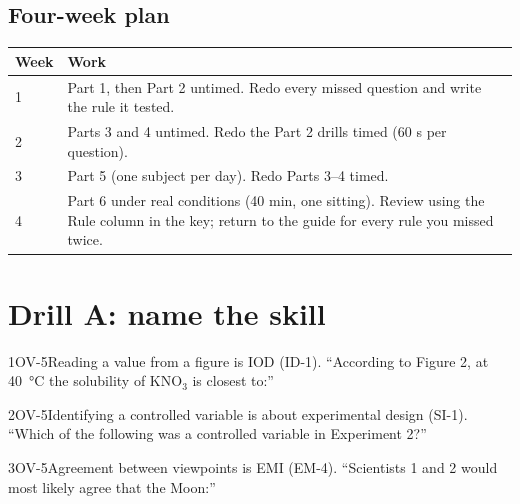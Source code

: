 \documentclass[11pt]{article}
\begin{document}
\subsection*{Four-week plan}
\small
\begin{tabularx}{\linewidth}{@{}l X@{}}
\toprule
Week & Work\\\midrule
1 & Part 1, then Part 2 untimed. Redo every missed question and write the rule it tested.\\
2 & Parts 3 and 4 untimed. Redo the Part 2 drills timed (60 s per question).\\
3 & Part 5 (one subject per day). Redo Parts 3--4 timed.\\
4 & Part 6 under real conditions (40 min, one sitting). Review using the Rule column in the key; return to the guide for every rule you missed twice.\\
\bottomrule
\end{tabularx}
\normalsize

\section{Drill A: name the skill}


\begin{q}{1}{OV-5}{Reading a value from a figure is IOD (ID-1).}
``According to Figure 2, at \SI{40}{\celsius} the solubility of KNO$_3$ is closest to:''
\end{q}

\begin{q}{2}{OV-5}{Identifying a controlled variable is about experimental design (SI-1).}
``Which of the following was a controlled variable in Experiment 2?''
\end{q}

\begin{q}{3}{OV-5}{Agreement between viewpoints is EMI (EM-4).}
``Scientists 1 and 2 would most likely agree that the Moon:''
\end{q}
\end{document}
